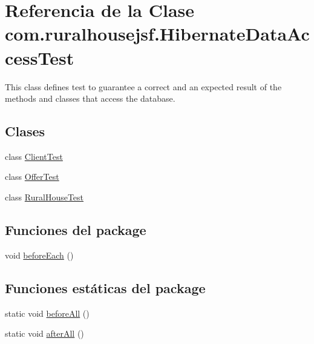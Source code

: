 \hypertarget{a00272}{}\section{Referencia de la Clase com.\+ruralhousejsf.\+Hibernate\+Data\+Access\+Test}
\label{a00272}


This class defines test to guarantee a correct and an expected result of the methods and classes that access the database.  


\subsection*{Clases}
\begin{DoxyCompactItemize}
\item 
class \mbox{\hyperlink{a00276}{Client\+Test}}
\item 
class \mbox{\hyperlink{a00280}{Offer\+Test}}
\item 
class \mbox{\hyperlink{a00284}{Rural\+House\+Test}}
\end{DoxyCompactItemize}
\subsection*{Funciones del \textquotesingle{}package\textquotesingle{}}
\begin{DoxyCompactItemize}
\item 
void \mbox{\hyperlink{a00272_a45f50c1176ffaef90f33dccb27e03cdd}{before\+Each}} ()
\end{DoxyCompactItemize}
\subsection*{Funciones estáticas del \textquotesingle{}package\textquotesingle{}}
\begin{DoxyCompactItemize}
\item 
static void \mbox{\hyperlink{a00272_a385a9a721138e301ab9b775298eff369}{before\+All}} ()
\item 
static void \mbox{\hyperlink{a00272_ad178c485d2837875d915e6876d29862c}{after\+All}} ()
\end{DoxyCompactItemize}

